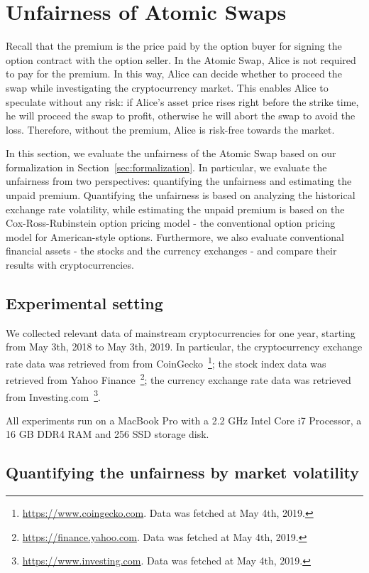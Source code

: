 \section{Unfairness of Atomic Swaps}
\label{sec:evaluation}

Recall that the premium is the price paid by the option buyer for signing the option contract with the option seller.
In the Atomic Swap, Alice is not required to pay for the premium.
In this way, Alice can decide whether to proceed the swap while investigating the cryptocurrency market.
This enables Alice to speculate without any risk:
if Alice's asset price rises right before the strike time, he will proceed the swap to profit, otherwise he will abort the swap to avoid the loss.
Therefore, without the premium, Alice is risk-free towards the market.

In this section, we evaluate the unfairness of the Atomic Swap based on our formalization in Section~\ref{sec:formalization}.
In particular, we evaluate the unfairness from two perspectives: quantifying the unfairness and estimating the unpaid premium.
Quantifying the unfairness is based on analyzing the historical exchange rate volatility, while estimating the unpaid premium is based on the Cox-Ross-Rubinstein option pricing model - the conventional option pricing model for American-style options.
Furthermore, we also evaluate conventional financial assets - the stocks and the currency exchanges - and compare their results with cryptocurrencies.

\subsection{Experimental setting}

We collected relevant data of mainstream cryptocurrencies for one year, starting from May 3th, 2018 to May 3th, 2019.
In particular, the cryptocurrency exchange rate data was retrieved from from CoinGecko~\footnote{\url{https://www.coingecko.com}. Data was fetched at May 4th, 2019.};
the stock index data was retrieved from Yahoo Finance~\footnote{\url{https://finance.yahoo.com}. Data was fetched at May 4th, 2019.};
the currency exchange rate data was retrieved from Investing.com~\footnote{\url{https://www.investing.com}. Data was fetched at May 4th, 2019.}.

All experiments run on a MacBook Pro with a 2.2 GHz Intel Core i7 Processor, a 16 GB DDR4 RAM and 256 SSD storage disk.

\subsection{Quantifying the unfairness by market volatility}
\label{subsec:volatility_analysis}

